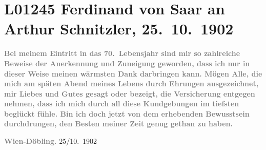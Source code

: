 

\section[Ferdinand von Saar an Arthur Schnitzler, 25. 10. 1902]{L01245 Ferdinand von Saar an Arthur Schnitzler, 25. 10. 1902}
\nopagebreak{}
\rehead{ }\normalsize\beginnumbering{}
\toendnotes[C]{\smallbreak\pagebreak[2]}
\toendnotes[C]{\smallbreak}
\toendnotes[C]{\smallbreak}
\pstart
           \noindent{}\textcolor{gray}{\textbf{{\pb}Bei meinem Eintritt in das
                  70. Lebensjahr sind mir so zahlreiche Beweise der Anerkennung und Zuneigung
                  geworden, dass ich nur in dieser Weise meinen wärmsten Dank darbringen kann. Mögen
                  Alle, die mich am späten Abend meines Lebens durch Ehrungen ausgezeichnet, mir
                  Liebes und Gutes gesagt oder bezeigt, die Versicherung entgegen nehmen, dass ich
                  mich durch all diese Kundgebungen im tiefsten beglückt fühle. Bin ich doch jetzt
                  von dem erhebenden Bewusstsein durchdrungen, den Besten meiner Zeit genug gethan
                  zu haben.}}\pend
           
\pstart
           \textcolor{gray}{\textbf{Wien-Döbling.}}{ }25/10. 1902\pend
           

